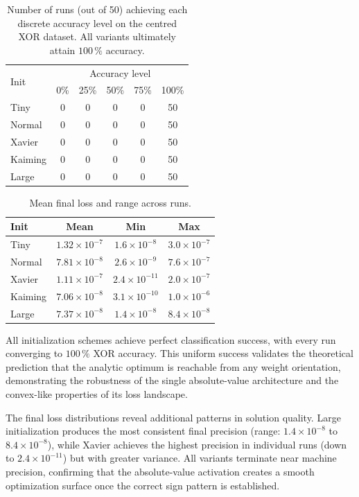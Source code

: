 \begin{table}[ht]
\centering
\caption{Number of runs (out of 50) achieving each discrete accuracy level on the centred XOR dataset.  All variants ultimately attain $100\,\%$ accuracy.}
\label{tab:abs1-init-accuracy}
\begin{tabular}{lccccc}
\toprule
\multirow{2}{*}{Init} & \multicolumn{5}{c}{Accuracy level}\\
\cmidrule(lr){2-6}
& 0\% & 25\% & 50\% & 75\% & 100\% \\
\midrule
Tiny    & 0 & 0 & 0 & 0 & 50 \\
Normal  & 0 & 0 & 0 & 0 & 50 \\
Xavier  & 0 & 0 & 0 & 0 & 50 \\
Kaiming & 0 & 0 & 0 & 0 & 50 \\
Large   & 0 & 0 & 0 & 0 & 50 \\
\bottomrule
\end{tabular}
\end{table}

\begin{table}[ht]
\centering
\caption{Mean final loss and range across runs.}
\label{tab:abs1-init-loss}
\begin{tabular}{lccc}
\toprule
Init & Mean & Min & Max \\
\midrule
Tiny    & $1.32\times10^{-7}$ & $1.6\times10^{-8}$ & $3.0\times10^{-7}$ \\
Normal  & $7.81\times10^{-8}$ & $2.6\times10^{-9}$ & $7.6\times10^{-7}$ \\
Xavier  & $1.11\times10^{-7}$ & $2.4\times10^{-11}$ & $2.0\times10^{-7}$ \\
Kaiming & $7.06\times10^{-8}$ & $3.1\times10^{-10}$ & $1.0\times10^{-6}$ \\
Large   & $7.37\times10^{-8}$ & $1.4\times10^{-8}$ & $8.4\times10^{-8}$ \\
\bottomrule
\end{tabular}
\end{table}

All initialization schemes achieve perfect classification success, with every run converging to $100\,\%$ XOR accuracy. This uniform success validates the theoretical prediction that the analytic optimum is reachable from any weight orientation, demonstrating the robustness of the single absolute-value architecture and the convex-like properties of its loss landscape.

The final loss distributions reveal additional patterns in solution quality. Large initialization produces the most consistent final precision (range: $1.4 \times 10^{-8}$ to $8.4 \times 10^{-8}$), while Xavier achieves the highest precision in individual runs (down to $2.4 \times 10^{-11}$) but with greater variance. All variants terminate near machine precision, confirming that the absolute-value activation creates a smooth optimization surface once the correct sign pattern is established.

